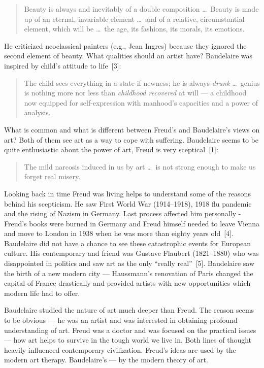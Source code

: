 \begin{multicols}{2}
\begin{quote}
	Beauty is always and inevitably of a double composition \dots\
	Beauty is made up of an eternal, invariable element \dots\ and of a relative, circumstantial element, which will be \dots\
	the age, its fashions, its morals, its emotions.
\end{quote}

He criticized neoclassical painters (e.g., Jean Ingres) because they ignored the second element of beauty.
What qualities should an artist have? Baudelaire was inspired by child's attitude to life~[3]:

\begin{quote}
	The child sees everything in a state if newness; he is always \textit{drunk} \dots\ genius is nothing more nor less than \textit{childhood recovered}
	at will --- a childhood now equipped for self-expression with manhood's capacities and a power of analysis.
\end{quote}

What is common and what is different between Freud's and Baudelaire's views on art?  Both of them see art as a way to
cope with suffering. Baudelaire seems to be quite enthusiastic about the power of art, Freud is very sceptical~[1]:

\begin{quote}
	The mild narcosis induced in us by art \dots\ is not strong enough to make us forget real misery.
\end{quote}

Looking back in time Freud was living helps to understand some of the reasons behind his scepticism. He saw
First World War (1914--1918), 1918 flu pandemic and the rising of Nazism in Germany. Last process affected
him personally - Freud's books were burned in Germany and Freud himself needed to leave Vienna and move to London in 1938
when he was more than eighty years old~[4]. Baudelaire did not have a chance to see these catastrophic events for European
culture. His contemporary and friend was Gustave Flaubert (1821--1880) who was disappointed in politics and saw art as
the only ``really real''~[5]. Baudelaire saw the birth of a new modern city --- Haussmann's renovation of Paris changed
the capital of France drastically and provided artists with new opportunities which modern life had to offer.

Baudelaire studied the nature of art much deeper than Freud. The reason seems to be obvious --- he was an artist and
was interested in obtaining profound understanding of art. Freud was a doctor and was focused on the practical issues ---
how art helps to survive in the tough world we live in. Both lines of thought heavily influenced contemporary
civilization. Freud's ideas are used by the modern art therapy. Baudelaire's --- by the modern theory of art.


\end{multicols}
